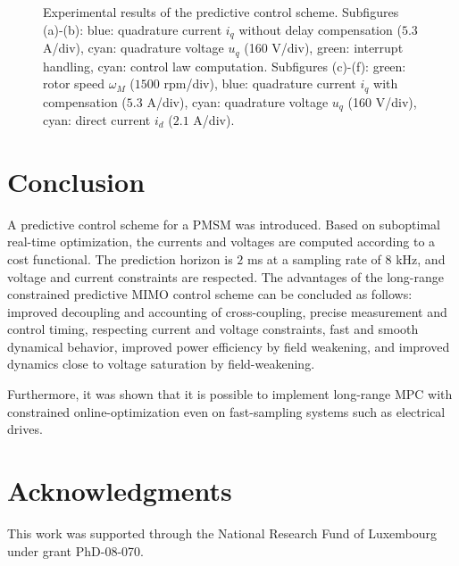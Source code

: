 \documentclass[a4paper,11pt,fleqn]{article}
\begin{document}
\begin{figure*}[!ht]
\centering
{}
\caption{Experimental results of the predictive control scheme. Subfigures (a)-(b): blue: quadrature current $i_q$ without delay compensation ($5.3$ A/div), cyan: quadrature voltage $u_q$ (160 V/div), green: interrupt handling, cyan: control law computation. Subfigures (c)-(f): green: rotor speed $\omega_M$ ($1500$ rpm/div), blue: quadrature current $i_q$ with compensation ($5.3$ A/div), cyan: quadrature voltage $u_q$ (160 V/div), cyan: direct current $i_d$ ($2.1$ A/div).\label{fig:results}}
\end{figure*}





\section*{Conclusion}
A predictive control scheme for a PMSM was introduced. Based on suboptimal real-time optimization, the currents and voltages are computed according to a cost functional. The prediction horizon is $2$ ms at a sampling rate of $8$ kHz, and voltage and current constraints are respected. The advantages of the long-range constrained predictive MIMO control scheme can be concluded as follows: improved decoupling and accounting of cross-coupling, precise measurement and control timing, respecting current and voltage constraints, fast and smooth dynamical behavior, improved power efficiency by field weakening, and improved dynamics close to voltage saturation by field-weakening.

Furthermore, it was shown that it is possible to implement long-range MPC with constrained online-optimization even on fast-sampling systems such as electrical drives.





\section*{Acknowledgments}
This work was supported through the National Research Fund of Luxembourg under grant PhD-08-070.
\end{document}
